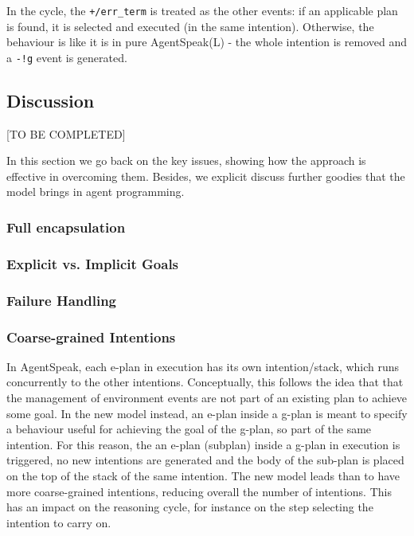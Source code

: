 \noindent In the cycle, the \texttt{+/err\_term} is treated as the other events: if an applicable plan is found, it is selected and executed (in the same intention). 
%
Otherwise, the behaviour is like it is in pure AgentSpeak(L) - the whole intention is removed and a \texttt{-!g} event is generated.

\subsection{Discussion}

[TO BE COMPLETED]

In this section we go back on the key issues, showing how the approach is effective in overcoming them.
%
Besides, we explicit discuss further goodies that the model brings in agent programming.

\subsubsection{Full encapsulation}

\subsubsection{Explicit vs. Implicit Goals}

\subsubsection{Failure Handling}

\subsubsection{Coarse-grained Intentions}

In AgentSpeak, each e-plan in execution has its own intention/stack, which runs concurrently to the other intentions. Conceptually, this follows the idea that that the management of environment events are not part of an existing plan to achieve some goal.
%
In the new model instead, an e-plan inside a g-plan is meant to specify a behaviour useful for achieving the goal of the g-plan, so part of the same intention.
%
For this reason, the an e-plan (subplan) inside a g-plan in execution is triggered, no new intentions are generated and the body of the sub-plan is placed on the top of the stack of the same intention. 
%
The new model leads than to have more coarse-grained intentions, reducing overall the number of intentions. This has an impact on the reasoning cycle, for instance on the step selecting the intention to carry on.

